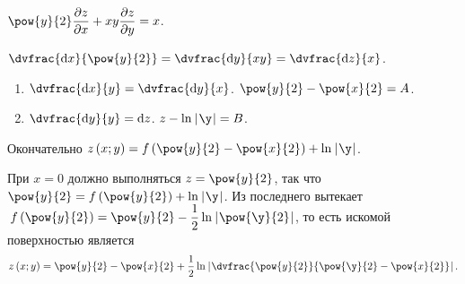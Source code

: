 \documentclass[a5paper,10pt]{article}
\begin{document}
    $\pow{y}{2} \parder{z} {x} + xy \parder{z} {y} = x$.
    
    $\dvfrac{\di x} {\pow{y}{2}} = \dvfrac{\di y} {xy} = \dvfrac{\di z} {x}$.
    
    \begin{enumerate}
        \item $\dvfrac{\di x} {y} = \dvfrac{\di y} {x}$.
        $\pow{y}{2} - \pow{x}{2} = A$.
        \item $\dvfrac{\di y} {y} = \di z$.
        $z - \ln\vbr{\y} = B$.
    \end{enumerate}

    Окончательно $z\br{x; y} = f\br{\pow{y}{2} - \pow{x}{2}} + \ln\vbr{\y}$.
    
    При $x = 0$ должно выполняться $z = \pow{y}{2}$, так что 
    $\pow{y}{2} = f\br{\pow{y}{2}} + \ln\vbr{\y}$. Из последнего вытекает
    $\,f\br{\pow{y}{2}} = \pow{y}{2} - \dfrac {1}{2}\ln\vbr{\pow{\y}{2}}$,
    то есть искомой поверхностью является
    $$z\br{x; y} = \pow{y}{2} - \pow{x}{2} + \dfrac{1}{2} \ln\vbr{\dvfrac {\pow{y}{2}}{\pow{\y}{2} - \pow{x}{2}}}.$$
\end{document}
